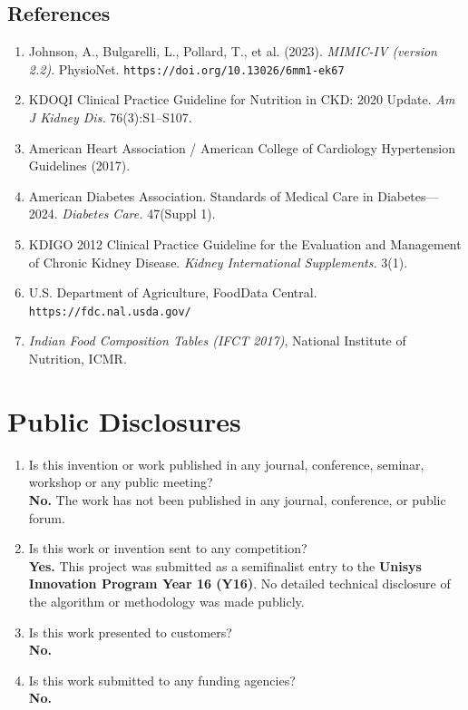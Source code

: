 \documentclass[a4paper,12pt]{article}
\begin{document}
\subsection*{References}
\begin{enumerate}[itemsep=0.3em]
    \item Johnson, A., Bulgarelli, L., Pollard, T., et al. (2023). \textit{MIMIC-IV (version 2.2)}. PhysioNet. \texttt{https://doi.org/10.13026/6mm1-ek67}
    \item KDOQI Clinical Practice Guideline for Nutrition in CKD: 2020 Update. \textit{Am J Kidney Dis.} 76(3):S1--S107.
    \item American Heart Association / American College of Cardiology Hypertension Guidelines (2017).
    \item American Diabetes Association. Standards of Medical Care in Diabetes---2024. \textit{Diabetes Care.} 47(Suppl 1).
    \item KDIGO 2012 Clinical Practice Guideline for the Evaluation and Management of Chronic Kidney Disease. \textit{Kidney International Supplements.} 3(1).
    \item U.S. Department of Agriculture, FoodData Central. \texttt{https://fdc.nal.usda.gov/}
    \item \textit{Indian Food Composition Tables (IFCT 2017)}, National Institute of Nutrition, ICMR.
\end{enumerate}

\section*{Public Disclosures}

\begin{enumerate}[itemsep=0.3em]
    \item Is this invention or work published in any journal, conference, seminar, workshop or any public meeting? \\
    \textbf{No.} The work has not been published in any journal, conference, or public forum.

    \item Is this work or invention sent to any competition? \\
    \textbf{Yes.} This project was submitted as a semifinalist entry to the \textbf{Unisys Innovation Program Year 16 (Y16)}. No detailed technical disclosure of the algorithm or methodology was made publicly.

    \item Is this work presented to customers? \\
    \textbf{No.}

    \item Is this work submitted to any funding agencies? \\
    \textbf{No.}
\end{enumerate}
\end{document}
